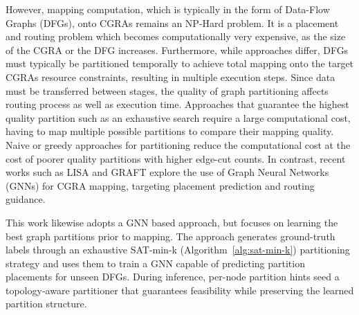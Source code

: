 \documentclass[runningheads]{llncs}
\begin{document}
However, mapping computation, which is typically in the form of Data-Flow Graphs (DFGs), onto CGRAs remains an NP-Hard problem. 
It is a placement and routing problem which becomes
computationally very expensive, as the size of the CGRA or the DFG increases. 
%
Furthermore, while approaches differ, DFGs must typically be partitioned temporally to achieve total mapping onto the target CGRAs resource constraints, resulting in multiple execution steps.
%
%
%
Since data must be transferred between stages, the quality of graph partitioning affects routing process as well as execution time.
%
%
%
Approaches that guarantee the highest quality partition such as an exhaustive search require a large computational cost, having to map multiple possible partitions to compare their mapping quality. Naive or greedy approaches for partitioning reduce the computational cost at the cost of poorer quality partitions with higher edge-cut counts.
%
In contrast, recent works such as LISA \cite{9773209} and GRAFT \cite{10416096} explore the use of Graph Neural Networks (GNNs) for CGRA mapping, targeting placement prediction and routing guidance. 


This work likewise adopts a GNN based approach, but focuses on learning the best graph partitions prior to mapping. 
The %
approach generates ground-truth labels through an exhaustive SAT-min-k (Algorithm~\ref{alg:sat-min-k}) partitioning strategy and uses them to train a GNN capable of predicting partition placements for unseen DFGs. During inference, per-node partition hints seed a topology-aware partitioner that guarantees feasibility while preserving the learned partition structure.
\end{document}
